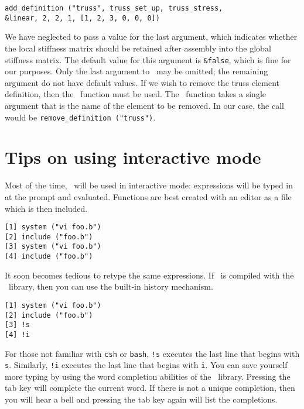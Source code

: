 \begin{center}
{\tt add\_definition ("truss", truss\_set\_up, truss\_stress, \\
\&linear, 2, 2, 1, [1, 2, 3, 0, 0, 0])}
\end{center}

We have neglected to pass a value for the last argument, which
indicates whether the local stiffness matrix should be retained after
assembly into the global stiffness matrix.  The default value for this
argument is {\tt \&false}, which is fine for our purposes.  Only the
last argument to \adddef\ may be omitted; the remaining argument do
not have default values.  If we wish to remove the truss element
definition, then the \remdef\ function must be used.  The \remdef\
function takes a single argument that is the name of the element to be
removed.  In our case, the call would be {\tt remove\_definition
("truss")}.


\section{Tips on using interactive mode}
\label{burlap.interactive-tips}

Most of the time, \burlap\ will be used in interactive mode:
expressions will be typed in at the prompt and evaluated.  Functions
are best created with an editor as a file which is then included.

\begin{screen}
\begin{verbatim}
[1] system ("vi foo.b")
[2] include ("foo.b")
[3] system ("vi foo.b")
[4] include ("foo.b")
\end{verbatim}
\end{screen}

It soon becomes tedious to retype the same expressions.  If \burlap\
is compiled with the \rl\ library, then you can use the built-in history
mechanism.

\begin{screen}
\begin{verbatim}
[1] system ("vi foo.b")
[2] include ("foo.b")
[3] !s
[4] !i
\end{verbatim}
\end{screen}

For those not familiar with {\tt csh} or {\tt bash}, {\tt !s} executes
the last line that begins with {\tt s}.  Similarly, {\tt !i} executes
the last line that begins with {\tt i}.  You can save yourself more
typing by using the word completion abilities of the \rl\ library.
Pressing the tab key will complete the current word.  If there is not
a unique completion, then you will hear a bell and pressing the tab
key again will list the completions.

